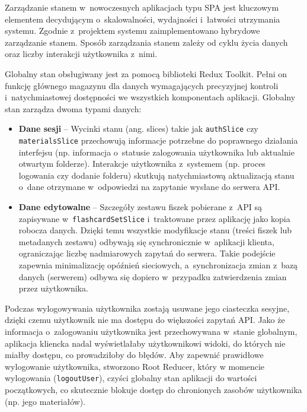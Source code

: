 Zarządzanie stanem w~nowoczesnych aplikacjach typu SPA jest kluczowym elementem decydującym o~skalowalności, 
wydajności i~łatwości utrzymania systemu. Zgodnie z~projektem systemu zaimplementowano hybrydowe zarządzanie stanem. 
Sposób zarządzania stanem zależy od cyklu życia danych oraz liczby interakcji użytkownika z~nimi.

Globalny stan obsługiwany jest za pomocą biblioteki Redux Toolkit. Pełni on funkcję głównego magazynu dla danych 
wymagających precyzyjnej kontroli i~natychmiastowej dostępności we wszystkich komponentach aplikacji. Globalny stan 
zarządza dwoma typami danych:
\begin{itemize} \sloppy
    \item \textbf{Dane sesji} -- Wycinki stanu (ang. slices) takie jak \texttt{authSlice} czy \texttt{materialsSlice} przechowują 
    informacje potrzebne do poprawnego działania interfejsu (np. informacja o~statusie zalogowania użytkownika lub 
    aktualnie otwartym folderze). Interakcje użytkownika z~systemem (np. proces logowania czy dodanie folderu) skutkują 
    natychmiastową aktualizacją stanu o~dane otrzymane w~odpowiedzi na zapytanie wysłane do serwera API.
    \item \textbf{Dane edytowalne} -- Szczegóły zestawu fiszek pobierane z~API są zapisywane w~\texttt{flashcardSetSlice} 
    i~traktowane przez aplikację jako kopia robocza danych. Dzięki temu wszystkie modyfikacje stanu 
    (treści fiszek lub metadanych zestawu) odbywają się synchronicznie w~aplikacji klienta, ograniczając liczbę nadmiarowych 
    zapytań do serwera. Takie podejście zapewnia minimalizację opóźnień sieciowych, a~synchronizacja zmian z~bazą 
    danych (serwerem) odbywa się dopiero w~przypadku zatwierdzenia zmian przez użytkownika.
\end{itemize}

Podczas wylogowywania użytkownika zostają usuwane jego ciasteczka sesyjne, dzięki czemu użytkownik nie ma dostępu do większości zapytań 
API. Jako że informacja o~zalogowaniu użytkownika jest przechowywana w~stanie globalnym, aplikacja kliencka nadal 
wyświetlałaby użytkownikowi widoki, do których nie miałby dostępu, co prowadziłoby do błędów.
Aby zapewnić prawidłowe wylogowanie użytkownika, stworzono Root Reducer, który 
w momencie wylogowania (\texttt{logoutUser}), czyści globalny stan aplikacji do wartości początkowych, co skutecznie 
blokuje dostęp do chronionych zasobów użytkownika (np. jego materiałów). 

